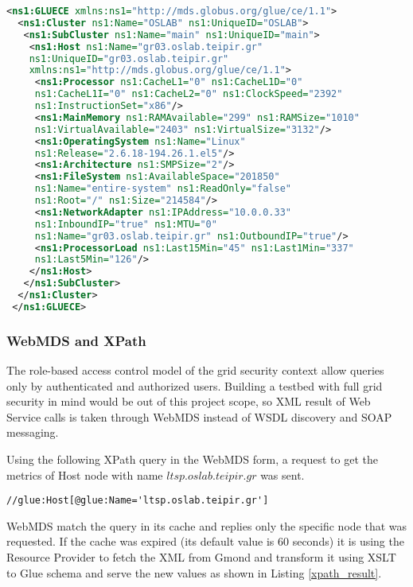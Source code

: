 \begin{lstlisting}[language=XML,caption=WSRF query output,label=wsrfquery]
 <ns1:GLUECE xmlns:ns1="http://mds.globus.org/glue/ce/1.1">
  <ns1:Cluster ns1:Name="OSLAB" ns1:UniqueID="OSLAB">
   <ns1:SubCluster ns1:Name="main" ns1:UniqueID="main">
    <ns1:Host ns1:Name="gr03.oslab.teipir.gr" 
    ns1:UniqueID="gr03.oslab.teipir.gr" 
    xmlns:ns1="http://mds.globus.org/glue/ce/1.1">
     <ns1:Processor ns1:CacheL1="0" ns1:CacheL1D="0" 
     ns1:CacheL1I="0" ns1:CacheL2="0" ns1:ClockSpeed="2392" 
     ns1:InstructionSet="x86"/>
     <ns1:MainMemory ns1:RAMAvailable="299" ns1:RAMSize="1010" 
     ns1:VirtualAvailable="2403" ns1:VirtualSize="3132"/>
     <ns1:OperatingSystem ns1:Name="Linux"
     ns1:Release="2.6.18-194.26.1.el5"/>
     <ns1:Architecture ns1:SMPSize="2"/>
     <ns1:FileSystem ns1:AvailableSpace="201850" 
     ns1:Name="entire-system" ns1:ReadOnly="false"
     ns1:Root="/" ns1:Size="214584"/>
     <ns1:NetworkAdapter ns1:IPAddress="10.0.0.33" 
     ns1:InboundIP="true" ns1:MTU="0" 
     ns1:Name="gr03.oslab.teipir.gr" ns1:OutboundIP="true"/>
     <ns1:ProcessorLoad ns1:Last15Min="45" ns1:Last1Min="337"
     ns1:Last5Min="126"/>
    </ns1:Host>
   </ns1:SubCluster>
  </ns1:Cluster>
 </ns1:GLUECE>
\end{lstlisting}

\subsubsection{WebMDS and XPath}

The role-based access control model of the grid security context allow queries only by authenticated and authorized users. Building a testbed with full grid security in mind would be out of this project scope, so XML result of Web Service calls is taken through WebMDS instead of WSDL discovery and SOAP messaging.

Using the following XPath query in the WebMDS form, a request to get the metrics of Host node with name $ltsp.oslab.teipir.gr$ was sent.

\begin{verbatim}
//glue:Host[@glue:Name='ltsp.oslab.teipir.gr']
\end{verbatim}

WebMDS match the query in its cache and replies only the specific node that was requested. If the cache was expired (its default value is 60 seconds) it is using the Resource Provider to fetch the XML from Gmond and transform it using XSLT to Glue schema and serve the new values as shown in Listing \ref{xpath_result}.

